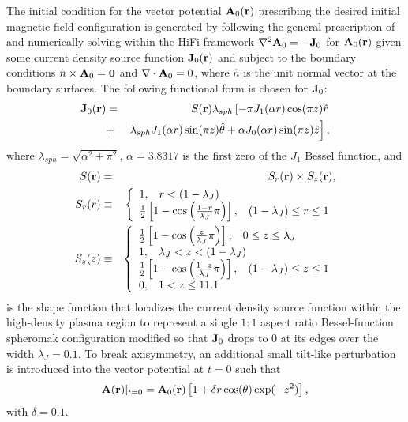 The initial condition for the vector potential $\mathbf{A}_0(\mathbf{r})$ prescribing the desired initial magnetic field configuration is generated by following the general prescription of \cite{Lukin11} and numerically solving within the HiFi framework $\nabla^2\mathbf{A}_0 = -\mathbf{J}_0$ for $\mathbf{A}_0(\mathbf{r})$ given some current density source function $\mathbf{J}_0(\mathbf{r})$ and subject to the boundary conditions $\hat{n}\times\mathbf{A}_0=\mathbf{0}$ and
$\nabla\cdot\mathbf{A}_0=0$, where $\hat{n}$ is the unit normal vector at the boundary surfaces.  The following functional form is chosen for $\mathbf{J}_0$:
\begin{eqnarray}
\mathbf{J}_0(\mathbf{r}) &=& S(\mathbf{r})
\lambda_{sph}\left[-\pi J_1(\alpha r)\cos(\pi z)\hat{r} \right.\nonumber\\
  &+& \left.\lambda_{sph} J_1(\alpha r)\sin(\pi z)\hat{\theta} 
  + \alpha J_0(\alpha r)\sin(\pi z)\hat{z}\right],
\end{eqnarray}
where $\lambda_{sph} = \sqrt{\alpha^2 + \pi^2}$,
$\alpha = 3.8317$ is the first zero of the $J_1$ Bessel function, and
\begin{eqnarray*}
S(\mathbf{r}) &=& S_r(\mathbf{r})\times S_z(\mathbf{r}), \\
S_r(r) &\equiv& \left\{\begin{array}{l} 
1, \hspace{3mm} r < (1 - \lambda_J) \\
\frac{1}{2}\left[1 - \cos\left(\frac{1-r}{\lambda_J}\pi\right)\right], \hspace{3mm} (1 - \lambda_J) \le r \le 1 \end{array}\right. \\
S_z(z) &\equiv& \left\{\begin{array}{l} 
\frac{1}{2}\left[1 - \cos\left(\frac{z}{\lambda_J}\pi\right)\right], \hspace{3mm} 0 \le z \le \lambda_J \\
1, \hspace{3mm} \lambda_J < z < (1 - \lambda_J) \\
\frac{1}{2}\left[1 - \cos\left(\frac{1-z}{\lambda_J}\pi\right)\right], \hspace{3mm} (1 - \lambda_J) \le z \le 1 \\
0, \hspace{3mm} 1 < z \le 11.1
\end{array}\right.
\end{eqnarray*}
is the shape function that localizes the current density source function within the high-density plasma region to represent a single $1:1$ aspect ratio Bessel-function spheromak configuration modified so that $\mathbf{J}_0$ drops to $0$ at its edges over the width $\lambda_J=0.1$.  To break axisymmetry, an additional small tilt-like perturbation is introduced into the vector potential at $t=0$ such that
\begin{equation}
\mathbf{A}(\mathbf{r})|_{t=0} = \mathbf{A}_0(\mathbf{r})\left[1 + \delta r\cos(\theta)\exp(-z^2)\right],
\end{equation}
with $\delta=0.1$.

